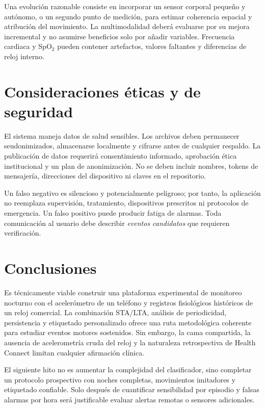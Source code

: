 \documentclass[12pt]{article}
\begin{document}
Una evolución razonable consiste en incorporar un sensor corporal pequeño y autónomo, o un segundo punto de medición, para estimar coherencia espacial y atribución del movimiento. La multimodalidad deberá evaluarse por su mejora incremental y no asumirse beneficios solo por añadir variables. Frecuencia cardiaca y SpO$_2$ pueden contener artefactos, valores faltantes y diferencias de reloj interno.

\section{Consideraciones éticas y de seguridad}

El sistema maneja datos de salud sensibles. Los archivos deben permanecer seudonimizados, almacenarse localmente y cifrarse antes de cualquier respaldo. La publicación de datos requerirá consentimiento informado, aprobación ética institucional y un plan de anonimización. No se deben incluir nombres, tokens de mensajería, direcciones del dispositivo ni claves en el repositorio.

Un falso negativo es silencioso y potencialmente peligroso; por tanto, la aplicación no reemplaza supervisión, tratamiento, dispositivos prescritos ni protocolos de emergencia. Un falso positivo puede producir fatiga de alarmas. Toda comunicación al usuario debe describir \textit{eventos candidatos} que requieren verificación.

\section{Conclusiones}

Es técnicamente viable construir una plataforma experimental de monitoreo nocturno con el acelerómetro de un teléfono y registros fisiológicos históricos de un reloj comercial. La combinación STA/LTA, análisis de periodicidad, persistencia y etiquetado personalizado ofrece una ruta metodológica coherente para estudiar eventos motores sostenidos. Sin embargo, la cama compartida, la ausencia de acelerometría cruda del reloj y la naturaleza retrospectiva de Health Connect limitan cualquier afirmación clínica.

El siguiente hito no es aumentar la complejidad del clasificador, sino completar un protocolo prospectivo con noches completas, movimientos imitadores y etiquetado confiable. Solo después de cuantificar sensibilidad por episodio y falsas alarmas por hora será justificable evaluar alertas remotas o sensores adicionales.
\end{document}
